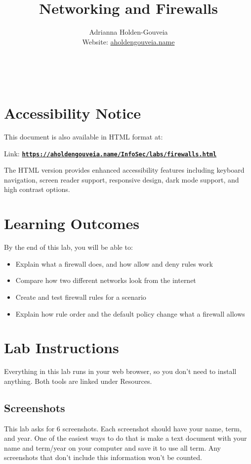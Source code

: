 \documentclass[12pt]{article}
\title{Networking and Firewalls}
\author{
        Adrianna Holden-Gouveia \\
        Website: \href{https://aholdengouveia.name}{aholdengouveia.name}\\ 
        \date{\vspace{-5ex}}
        \faGithub {: aholdengouveia} \\
        \faTwitter {: aholdengouveia} \\
        }
\begin{document}
    

\maketitle

\section*{Accessibility Notice}
This document is also available in HTML format at:

Link: \href{https://aholdengouveia.name/InfoSec/labs/firewalls.html}{\textbf{\nolinkurl{https://aholdengouveia.name/InfoSec/labs/firewalls.html}}}

The HTML version provides enhanced accessibility features including keyboard navigation, screen reader support, responsive design, dark mode support, and high contrast options.



\section*{Learning Outcomes}
By the end of this lab, you will be able to:
\begin{itemize}
    \item Explain what a firewall does, and how allow and deny rules work
    \item Compare how two different networks look from the internet
    \item Create and test firewall rules for a scenario
    \item Explain how rule order and the default policy change what a firewall allows
\end{itemize}

\section*{Lab Instructions}
Everything in this lab runs in your web browser, so you don't need to install anything. Both tools are linked under Resources.

\subsection*{Screenshots}
This lab asks for 6 screenshots. Each screenshot should have your name, term, and year.  One of the easiest ways to do that is make a text document with your name and term/year on your computer and save it to use all term. Any screenshots that don't include this information won't be counted.
\end{document}
